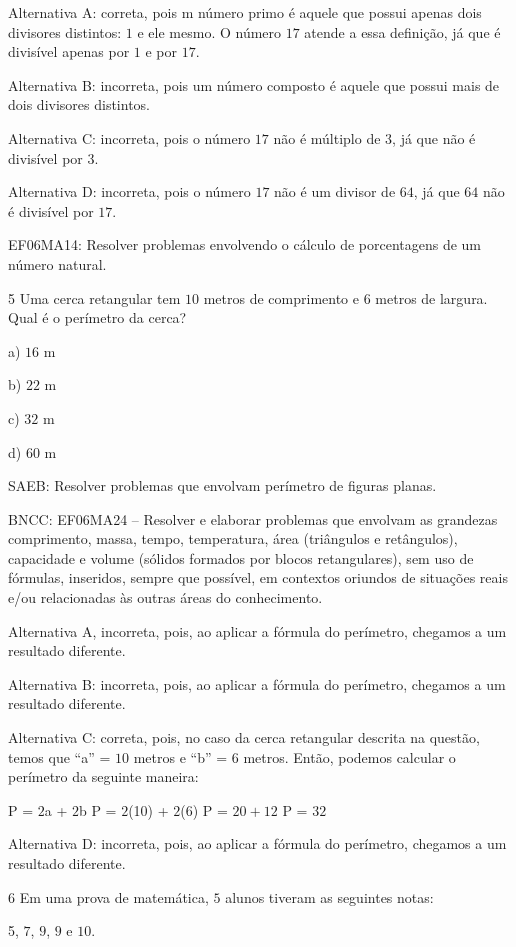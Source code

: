 Alternativa A: correta, pois m número primo é aquele que possui apenas
dois divisores distintos: $1$ e ele mesmo. O número $17$ atende a essa
definição, já que é divisível apenas por $1$ e por $17$.

Alternativa B: incorreta, pois um número composto é aquele que possui
mais de dois divisores distintos.

Alternativa C: incorreta, pois o número $17$ não é múltiplo de $3$, já que
não é divisível por $3$.

Alternativa D: incorreta, pois o número $17$ não é um divisor de $64$, já
que $64$ não é divisível por $17$.

EF06MA14: Resolver problemas envolvendo o cálculo de porcentagens de um
número natural.

\num{5}  Uma cerca retangular tem $10$ metros de comprimento e $6$ metros de
largura. Qual é o perímetro da cerca?

a) $16$ m

b) $22$ m

c) $32$ m

d) $60$ m

SAEB: Resolver problemas que envolvam perímetro de figuras planas.

BNCC: EF06MA24 -- Resolver e elaborar problemas que envolvam as
grandezas comprimento, massa, tempo, temperatura, área (triângulos e
retângulos), capacidade e volume (sólidos formados por blocos
retangulares), sem uso de fórmulas, inseridos, sempre que possível, em
contextos oriundos de situações reais e/ou relacionadas às outras áreas
do conhecimento.

Alternativa A, incorreta, pois, ao aplicar a fórmula do perímetro,
chegamos a um resultado diferente.

Alternativa B: incorreta, pois, ao aplicar a fórmula do perímetro,
chegamos a um resultado diferente.

Alternativa C: correta, pois, no caso da cerca retangular descrita na
questão, temos que ``a'' = $10$ metros e ``b'' = $6$ metros. Então, podemos
calcular o perímetro da seguinte maneira:

P = $2$a + $2$b P = $2$(10) + $2$(6) P = $20 + 12$ P = $32$

Alternativa D: incorreta, pois, ao aplicar a fórmula do perímetro,
chegamos a um resultado diferente.

\num{6}  Em uma prova de matemática, $5$ alunos tiveram as seguintes notas:

5, $7$, $9$, $9$ e $10$.

